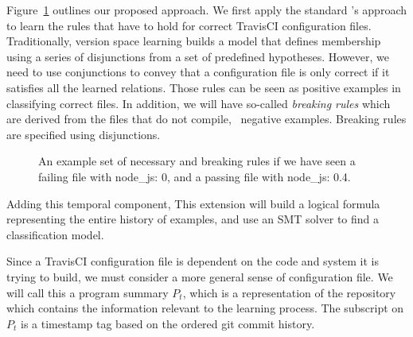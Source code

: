 Figure~\ref{fig:versionSL} outlines our proposed approach. We first apply the standard \app's approach to learn the rules that have 
to hold for correct TravisCI configuration files. Traditionally, 
version space learning builds a model that defines membership using a series of 
disjunctions from a set of predefined hypotheses.  However, we need  to 
use conjunctions to convey that a configuration file is only correct if 
it satisfies all the learned relations. Those rules can be seen as
positive examples in classifying correct files. In addition, we will have
so-called {\emph {breaking rules}} which are derived from the files 
that do not compile, \ie~negative examples. Breaking rules are specified 
using disjunctions.


\begin{figure}[!tbh]
  \centering
  \caption{An example set of necessary and breaking rules if we have seen a failing file with {\footnotesize node\_js: 0}, and a passing file with {\footnotesize node\_js: 0.4.}}
  \label{fig:versionSL}
\end{figure}



 Adding this temporal component, 
This extension will build a logical formula representing the entire 
history of examples, and use an SMT solver to find a classification model.

Since a TravisCI configuration file is dependent
on the code and system it is trying to build, 
we must consider a more general sense of configuration file.
We will call this a program summary $P_t$, which is a representation 
of the repository which contains the information 
relevant to the learning process.
The subscript on $P_t$ is a timestamp tag based on 
the ordered git commit history.

